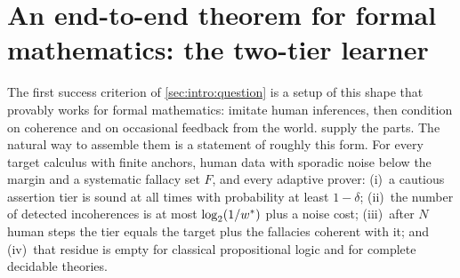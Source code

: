 \providecommand{\Steps}{\mathrm{Steps}}
\providecommand{\Ttrust}{T_{\mathrm{trust}}}
\providecommand{\Fres}[1]{F^{(#1)}_{\mathrm{res}}}
\providecommand{\Refut}{\mathrm{Ref}}
\providecommand{\Conf}{\mathrm{Conf}}
\providecommand{\Coll}{\mathrm{Coll}}
\providecommand{\Fsurv}[1]{F^{\mathrm{surv}}_{#1}}
\providecommand{\TTL}{\mathrm{TTL}}
\providecommand{\mgu}{\mathrm{mgu}}
\providecommand{\Prf}{\mathrm{Prf}}
\providecommand{\Sub}{\mathrm{Sub}}
\providecommand{\RobQ}{\mathsf{Q}}
\providecommand{\Ccal}{\mathcal{C}}
\providecommand{\Vcal}{\mathcal{V}}
\providecommand{\Fm}{\mathrm{Fm}}

\section{An end-to-end theorem for formal mathematics: the two-tier learner}\label{sec:twotier}

The first success criterion of \cref{sec:intro:question} is a setup of this shape that provably works for formal mathematics: imitate human inferences, then condition on coherence and on occasional feedback from the world.  supply the parts. The natural way to assemble them is a statement of roughly this form. For every target calculus with finite anchors, human data with sporadic noise below the margin and a systematic fallacy set $F$, and every adaptive prover:
(i)~a cautious assertion tier is sound at all times with probability at least $1-\delta$;
(ii)~the number of detected incoherences is at most $\log_2(1/w^{*})$ plus a noise cost;
(iii)~after $N$ human steps the tier equals the target plus the fallacies coherent with it; and
(iv)~that residue is empty for classical propositional logic and for complete decidable theories.


